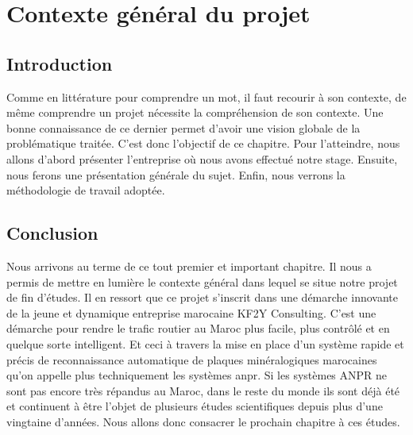 \chapter{\textbf{Contexte général du projet}}

\section{Introduction}

Comme en littérature pour comprendre un mot, il faut recourir à son contexte, de même comprendre un projet nécessite la compréhension de son contexte. Une bonne connaissance de ce dernier permet d’avoir une vision globale de la problématique traitée. C’est donc l’objectif de ce chapitre. Pour l’atteindre, nous allons d’abord présenter l’entreprise où nous avons effectué notre stage. Ensuite, nous ferons une présentation générale du sujet. Enfin, nous verrons la méthodologie de travail adoptée.





\section{Conclusion}
Nous arrivons au terme de ce tout premier et important chapitre. Il nous a permis de mettre en lumière le contexte général dans lequel se situe notre projet de fin d’études. Il en ressort que ce projet s’inscrit dans une démarche innovante de la jeune et dynamique entreprise marocaine KF2Y Consulting. C’est une démarche pour rendre le trafic routier au Maroc plus facile, plus contrôlé et en quelque sorte intelligent. Et ceci à travers la mise en place d’un système rapide et précis de reconnaissance automatique de plaques minéralogiques marocaines qu'on appelle plus techniquement les systèmes \acrshort{anpr}. Si les systèmes ANPR ne sont pas encore très répandus au Maroc, dans le reste du monde ils sont déjà été et continuent à être l'objet de plusieurs études scientifiques depuis plus d’une vingtaine d’années. Nous allons donc consacrer le prochain chapitre à ces études.